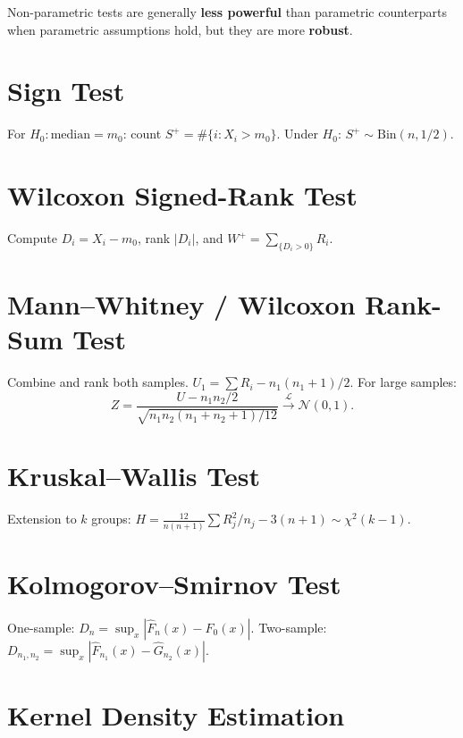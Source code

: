 \begin{warning}
Non-parametric tests are generally \textbf{less powerful} than parametric counterparts when parametric assumptions hold, but they are more \textbf{robust}.
\end{warning}

\section{Sign Test}

For $H_0:\text{median}=m_0$: count $S^+=\#\{i:X_i>m_0\}$. Under $H_0$: $S^+\sim\mathrm{Bin}(n,1/2)$.

\section{Wilcoxon Signed-Rank Test}

Compute $D_i=X_i-m_0$, rank $|D_i|$, and $W^+=\sum_{\{D_i>0\}} R_i$.

\section{Mann--Whitney / Wilcoxon Rank-Sum Test}

Combine and rank both samples. $U_1=\sum R_i - n_1(n_1+1)/2$. For large samples:
\[
Z = \frac{U-n_1n_2/2}{\sqrt{n_1n_2(n_1+n_2+1)/12}} \xrightarrow{\mathcal{L}} \mathcal{N}(0,1).
\]

\section{Kruskal--Wallis Test}

Extension to $k$ groups: $H = \frac{12}{n(n+1)}\sum R_j^2/n_j - 3(n+1) \sim \chi^2(k-1)$.

\section{Kolmogorov--Smirnov Test}

One-sample: $D_n=\sup_x|\hat{F}_n(x)-F_0(x)|$. Two-sample: $D_{n_1,n_2}=\sup_x|\hat{F}_{n_1}(x)-\hat{G}_{n_2}(x)|$.

\section{Kernel Density Estimation}


